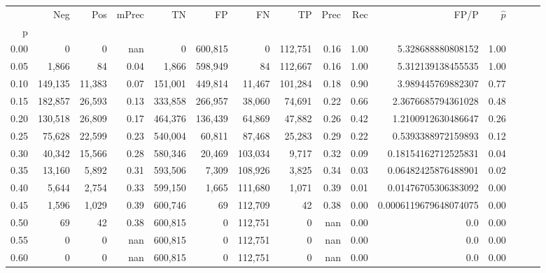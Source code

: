\begin{tabular}{rrrrrrrrrrrrrrr}
\toprule
{} &      Neg &     Pos & mPrec &       TN &       FP &       FN &       TP &  Prec &   Rec &                   FP/P & $\hat{p}$ \\
p    &          &         &       &          &          &          &          &       &       &                        &           \\
\midrule
0.00 &        0 &       0 &   nan &        0 &  600,815 &        0 &  112,751 &  0.16 &  1.00 &      5.328688880808152 &      1.00 \\
0.05 &    1,866 &      84 &  0.04 &    1,866 &  598,949 &       84 &  112,667 &  0.16 &  1.00 &      5.312139138455535 &      1.00 \\
0.10 &  149,135 &  11,383 &  0.07 &  151,001 &  449,814 &   11,467 &  101,284 &  0.18 &  0.90 &      3.989445769882307 &      0.77 \\
0.15 &  182,857 &  26,593 &  0.13 &  333,858 &  266,957 &   38,060 &   74,691 &  0.22 &  0.66 &     2.3676685794361028 &      0.48 \\
0.20 &  130,518 &  26,809 &  0.17 &  464,376 &  136,439 &   64,869 &   47,882 &  0.26 &  0.42 &     1.2100912630486647 &      0.26 \\
0.25 &   75,628 &  22,599 &  0.23 &  540,004 &   60,811 &   87,468 &   25,283 &  0.29 &  0.22 &     0.5393388972159893 &      0.12 \\
0.30 &   40,342 &  15,566 &  0.28 &  580,346 &   20,469 &  103,034 &    9,717 &  0.32 &  0.09 &    0.18154162712525831 &      0.04 \\
0.35 &   13,160 &   5,892 &  0.31 &  593,506 &    7,309 &  108,926 &    3,825 &  0.34 &  0.03 &    0.06482425876488901 &      0.02 \\
0.40 &    5,644 &   2,754 &  0.33 &  599,150 &    1,665 &  111,680 &    1,071 &  0.39 &  0.01 &    0.01476705306383092 &      0.00 \\
0.45 &    1,596 &   1,029 &  0.39 &  600,746 &       69 &  112,709 &       42 &  0.38 &  0.00 &  0.0006119679648074075 &      0.00 \\
0.50 &       69 &      42 &  0.38 &  600,815 &        0 &  112,751 &        0 &   nan &  0.00 &                    0.0 &      0.00 \\
0.55 &        0 &       0 &   nan &  600,815 &        0 &  112,751 &        0 &   nan &  0.00 &                    0.0 &      0.00 \\
0.60 &        0 &       0 &   nan &  600,815 &        0 &  112,751 &        0 &   nan &  0.00 &                    0.0 &      0.00 \\

\end{tabular}
